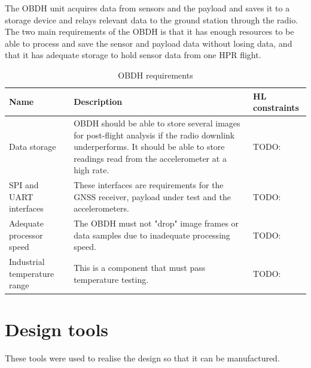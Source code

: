\documentclass{report}
\begin{document}
The OBDH unit acquires data from sensors and the payload and saves it to a storage device and relays relevant data to the ground station through the radio. The two main requirements of the OBDH is that it has enough resources to be able to process and save the sensor and payload data without losing data, and that it has adequate storage to hold sensor data from one HPR flight.

\begin{table}[H]
  \centering
  \begin{tabular}{|p{}|p{}|p{}|}
    \hline
    \textbf{Name}                & \textbf{Description}                                                                                                                                                                      & \textbf{HL constraints} \\ \hline
    Data storage                 & OBDH should be able to store several images for post-flight analysis if the radio downlink underperforms. It should be able to store readings read from the accelerometer at a high rate. & TODO:                   \\\hline
    SPI and UART interfaces      & These interfaces are requirements for the GNSS receiver, payload under test and the accelerometers.                                                                                       & TODO:                   \\\hline
    Adequate processor speed     & The OBDH must not "drop" image frames or data samples due to inadequate processing speed.                                                                                                 & TODO:                   \\\hline
    Industrial temperature range & This is a component that must pass temperature testing.                                                                                                                                   & TODO:                   \\\hline
  \end{tabular}
  \caption{OBDH requirements}
  \label{tabl:obdh-requirements}
\end{table}


\section{Design tools}
\label{sec:design-tools}

These tools were used to realise the design so that it can be manufactured.
\end{document}
